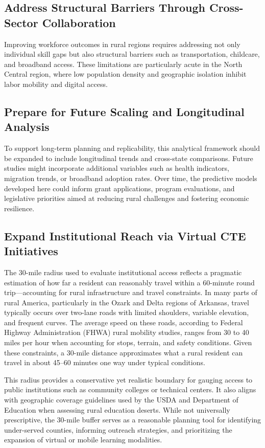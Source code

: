 \documentclass{llncs}
\begin{document}
\subsection{Address Structural Barriers Through Cross-Sector Collaboration}
Improving workforce outcomes in rural regions requires addressing not only individual skill gaps but also structural barriers such as transportation, childcare, and broadband access. These limitations are particularly acute in the North Central region, where low population density and geographic isolation inhibit labor mobility and digital access.

\subsection{Prepare for Future Scaling and Longitudinal Analysis}
To support long-term planning and replicability, this analytical framework should be expanded to include longitudinal trends and cross-state comparisons. Future studies might incorporate additional variables such as health indicators, migration trends, or broadband adoption rates. Over time, the predictive models developed here could inform grant applications, program evaluations, and legislative priorities aimed at reducing rural challenges and fostering economic resilience.

\subsection{Expand Institutional Reach via Virtual CTE Initiatives}

\begin{tcolorbox}[colback=gray!5!white, colframe=black, title=Justification for 30-Mile Radius Buffer]
The 30-mile radius used to evaluate institutional access reflects a pragmatic estimation of how far a resident can reasonably travel within a 60-minute round trip—accounting for rural infrastructure and travel constraints. In many parts of rural America, particularly in the Ozark and Delta regions of Arkansas, travel typically occurs over two-lane roads with limited shoulders, variable elevation, and frequent curves. The average speed on these roads, according to Federal Highway Administration (FHWA) rural mobility studies, ranges from 30 to 40 miles per hour when accounting for stops, terrain, and safety conditions. Given these constraints, a 30-mile distance approximates what a rural resident can travel in about 45–60 minutes one way under typical conditions. 

This radius provides a conservative yet realistic boundary for gauging access to public institutions such as community colleges or technical centers. It also aligns with geographic coverage guidelines used by the USDA and Department of Education when assessing rural education deserts. While not universally prescriptive, the 30-mile buffer serves as a reasonable planning tool for identifying under-served counties, informing outreach strategies, and prioritizing the expansion of virtual or mobile learning modalities.
\end{tcolorbox}
\end{document}
